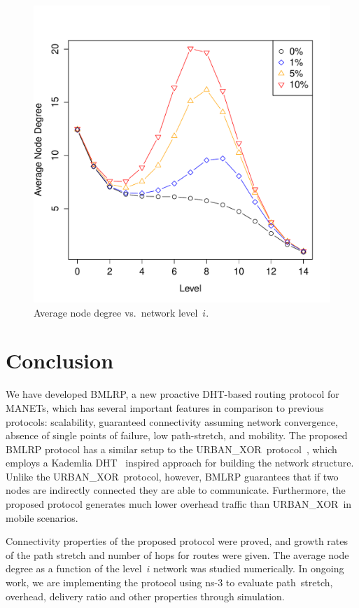\documentclass[conference]{IEEEtran}
\theoremstyle{definition}
\newcommand{\urbanxor}{URBAN\_XOR}
\begin{document}
\begin{figure}[H]
   \includegraphics[width=0.95\linewidth]{degrees}

   \caption{Average node degree vs.\ network level~$i$.}
    \label{fig:degrees}
\end{figure}


\section{Conclusion}
\label{sec:conclusion}

We have developed BMLRP, a new proactive DHT-based routing protocol for MANETs, which has several important features in comparison to previous protocols: scalability, guaranteed connectivity assuming network convergence,  absence of single points of failure, low path-stretch, and mobility. The proposed BMLRP protocol has a similar setup to the \urbanxor\ protocol~\cite{Pasquini}, which employs a Kademlia DHT~\cite{kademlia} inspired approach for building the network structure. Unlike the \urbanxor\ protocol, however, BMLRP guarantees that if two nodes are indirectly connected they are able to communicate. Furthermore, the proposed protocol generates much lower overhead traffic than \urbanxor\ in mobile scenarios.  

Connectivity properties of the proposed protocol were proved, and growth rates of the path stretch and number of hops for routes were given. The average node degree as a function of the level~$i$ network was studied numerically. In ongoing work, we are implementing the protocol using ns-3 to evaluate path~stretch, overhead, delivery ratio and other properties through simulation.




\end{document}
